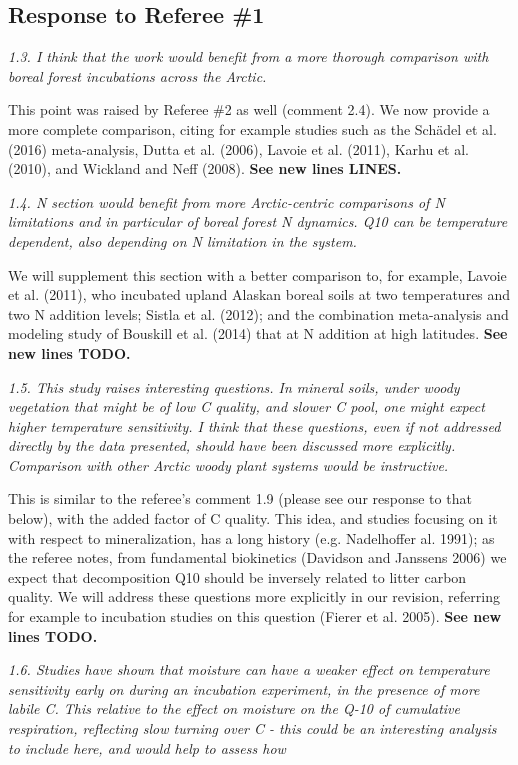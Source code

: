 \documentclass[11pt, oneside]{article}
\begin{document}
\subsection*{Response to Referee \#1}

{\it 1.3. I think that the work would benefit from a more thorough comparison with boreal forest incubations across the Arctic. }

This point was raised by Referee \#2 as well (comment 2.4). We now provide a more complete comparison, citing for example studies such as the Schädel et al. (2016) meta-analysis, Dutta et al. (2006), Lavoie et al. (2011), Karhu et al. (2010), and Wickland and Neff (2008). {\bf See new lines LINES.}

\medskip
{\it 1.4. N section would benefit from more Arctic-centric comparisons of N limitations and in particular of boreal forest N dynamics. Q10 can be temperature dependent, also depending on N limitation in the system. }

We will supplement this section with a better comparison to, for example, Lavoie et al. (2011), who incubated upland Alaskan boreal soils at two temperatures and two N addition levels; Sistla et al. (2012); and the combination meta-analysis and modeling study of Bouskill et al. (2014) that at N addition at high latitudes. {\bf See new lines TODO.}

\medskip
{\it 1.5. This study raises interesting questions. In mineral soils, under woody vegetation that might be of low C quality, and slower C pool, one might expect higher temperature sensitivity. I think that these questions, even if not addressed directly by the data presented, should have been discussed more explicitly. Comparison with other Arctic woody plant systems would be instructive. }

This is similar to the referee's comment 1.9 (please see our response to that below), with the added factor of C quality. This idea, and studies focusing on it with respect to mineralization, has a long history (e.g. Nadelhoffer al. 1991); as the referee notes, from fundamental biokinetics (Davidson and Janssens 2006) we expect that decomposition Q10 should be inversely related to litter carbon quality. We will address these questions more explicitly in our revision, referring for example to incubation studies on this question (Fierer et al. 2005). {\bf See new lines TODO.}

\medskip
{\it 1.6. Studies have shown that moisture can have a weaker effect on temperature sensitivity early on during an incubation experiment, in the presence of more labile C. This relative to the effect on moisture on the Q-10 of cumulative respiration, reflecting slow turning over C - this could be an interesting analysis to include here, and would help to assess how }
\end{document}

